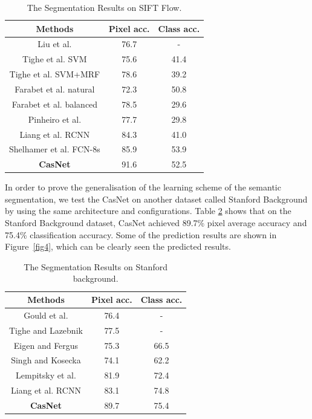 \documentclass[10.5pt,compsoc]{TsT}
\newcommand{\upcite}[1]{\superscript{\textsuperscript{\cite{#1}}}}
\theoremstyle{mystyle}
\newcommand{\upcite}[1]{\textsuperscript{\cite{#1}}}
\begin{document}
{\begin{table}[h]
\large
\setlength{\belowcaptionskip}{12pt}
\caption{The Segmentation Results on SIFT Flow.}
\label{table1}
\centering
\begin{tabular}{ccc}
\hline 
Methods & Pixel acc. & Class acc. \\
\hline
Liu et al.\upcite{6} & 76.7 & - \\
Tighe et al. SVM\upcite{25} & 75.6 & 41.4 \\
Tighe et al. SVM+MRF\upcite{26} & 78.6 & 39.2 \\
Farabet et al. natural\upcite{11} & 72.3 & 50.8 \\
Farabet et al. balanced\upcite{11} & 78.5 & 29.6 \\
Pinheiro et al.\upcite{13} & 77.7 & 29.8 \\
Liang et al. RCNN\upcite{24} & 84.3 & 41.0 \\
Shelhamer et al. FCN-8s\upcite{4} & 85.9 & 53.9 \\
\textbf{CasNet} & 91.6 & 52.5 \\

\hline
\end{tabular}
\end{table}

In order to prove the generalisation of the learning scheme of the semantic segmentation, we test the CasNet on another dataset called Stanford Background by using the same architecture and configurations. Table \ref{table2} shows that on the Stanford Background dataset, CasNet achieved 89.7\% pixel average accuracy and 75.4\% classification accuracy. Some of the prediction results are shown in Figure~\ref{fig4}, which can be clearly seen the predicted results.

\begin{table}[h]
\large
\setlength{\belowcaptionskip}{12pt}
\caption{The Segmentation Results on Stanford background.}
\label{table2}
\centering
\begin{tabular}{ccc}
\hline 
Methods & Pixel acc. & Class acc. \\
\hline
Gould et al.\upcite{7} & 76.4 & - \\
Tighe and Lazebnik\upcite{25} & 77.5 & - \\
Eigen and Fergus\upcite{28} & 75.3 & 66.5 \\
Singh and Kosecka\upcite{27} & 74.1 & 62.2 \\
Lempitsky et al.\upcite{10} & 81.9 & 72.4 \\
Liang et al. RCNN\upcite{24} & 83.1 & 74.8 \\
\textbf{CasNet} & 89.7 & 75.4 \\
\hline
\end{tabular}
\end{table}

}
\end{document}
